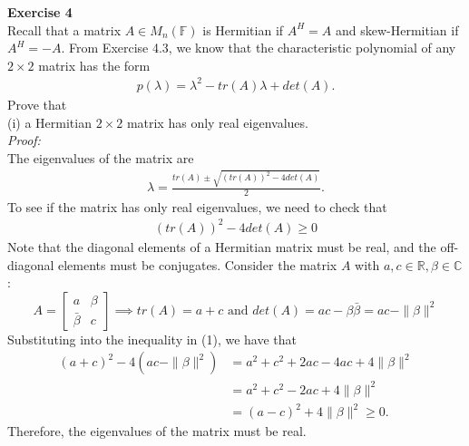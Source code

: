 \documentclass[letterpaper,12pt]{article}
\theoremstyle{definition}
\begin{document}
\textbf{Exercise 4} \\
Recall that a matrix $A \in M_n(\mathbb{F})$ is Hermitian if $A^H=A$ and skew-Hermitian if $A^H=-A$. From Exercise 4.3, we know that the characteristic polynomial of any $2 \times 2$ matrix has the form
\begin{align*}
  p(\lambda) = \lambda ^2 - tr(A)\lambda + det(A).
\end{align*}
Prove that \\
(i) a Hermitian $2 \times 2$ matrix has only real eigenvalues. \\
\textit{Proof:} \\
The eigenvalues of the matrix are
\begin{align*}
  \lambda = \frac{tr(A) \pm \sqrt{(tr(A))^2 - 4 det(A)}}{2}.
\end{align*}
To see if the matrix has only real eigenvalues, we need to check that
\begin{align}
  (tr(A))^2 - 4 det(A) \geq 0
\end{align}
Note that the diagonal elements of a Hermitian matrix must be real, and the off-diagonal elements must be conjugates. Consider the matrix $A$ with $a, c \in \mathbb{R}, \beta \in \mathbb{C}$:
\[ A =
\begin{bmatrix}
  a & \beta \\
  \bar{\beta} & c
\end{bmatrix}
\implies tr(A) = a + c
\text{ and } det(A) = ac - \beta\bar{\beta} = ac - \|\beta\|^2
\]
Substituting into the inequality in (1), we have that
\begin{align*}
  (a + c)^2 - 4(ac - \|\beta\|^2)
  &= a^2 + c^2 + 2ac - 4ac + 4\|\beta\|^2 \\
  &= a^2 + c^2 - 2ac + 4\|\beta\|^2 \\
  &= (a - c)^2 + 4\|\beta\|^2 \geq 0.
\end{align*}
Therefore, the eigenvalues of the matrix must be real. \\
\end{document}
